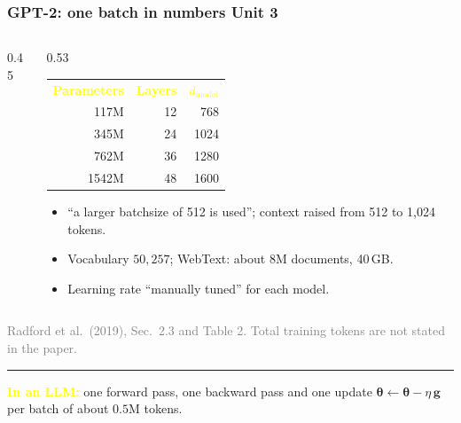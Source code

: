 \documentclass[12pt]{beamer}
\newcommand{\FrameTitle}[2]{\frametitle{#1 \hfill \small\textnormal{\textcolor{midgray}{#2}}}}
\begin{document}
\begin{frame}\FrameTitle{GPT-2: one batch in numbers}{Unit 3}
\begin{columns}[T]
\begin{column}{0.45\linewidth}
  \centering
\end{column}
\begin{column}{0.53\linewidth}
  \footnotesize
  \begin{tabular}{@{}rrr@{}}
  \textcolor{yellow}{\textbf{Parameters}} & \textcolor{yellow}{\textbf{Layers}} & \textcolor{yellow}{\textbf{$d_{\text{model}}$}} \\
  117M & 12 & 768 \\ 345M & 24 & 1024 \\ 762M & 36 & 1280 \\ 1542M & 48 & 1600
  \end{tabular}
  \begin{itemize}\footnotesize\setlength{\itemsep}{1.2mm}
    \item ``a larger batchsize of 512 is used''; context raised from 512 to 1,024 tokens.
    \item Vocabulary $50{,}257$; WebText: about 8M documents, 40\,GB.
    \item Learning rate ``manually tuned'' for each model.
  \end{itemize}
\end{column}
\end{columns}
{\par\vspace{1mm}\footnotesize\textcolor{gray}{Radford et al.\ (2019), Sec.\ 2.3 and Table 2. Total training tokens are not stated in the paper.}\par}
\vfill
{\color{yellow}\rule{\linewidth}{0.5pt}}\par\vspace{1mm}
{\raggedright\small\textcolor{yellow}{\textbf{In an LLM:}} one forward pass, one backward pass and one update $\symbf{\theta}\leftarrow\symbf{\theta}-\eta\,\symbf{g}$ per batch of about $0.5$M tokens.\par}
\end{frame}
\end{document}

